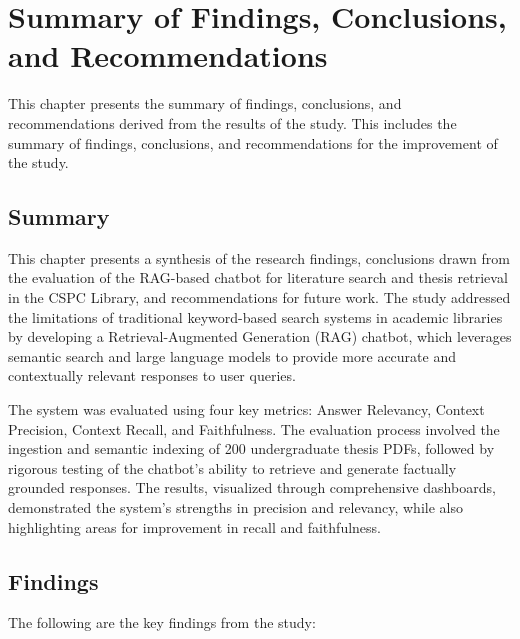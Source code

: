 \chapter{Summary of Findings, Conclusions, and Recommendations}
\begin{refsection}

This chapter presents the summary of findings, conclusions, and recommendations derived from the results of the study. This includes the summary of findings, conclusions, and recommendations for the improvement of the study.

\section*{Summary}

This chapter presents a synthesis of the research findings, conclusions drawn from the evaluation of the RAG-based chatbot for literature search and thesis retrieval in the CSPC Library, and recommendations for future work. The study addressed the limitations of traditional keyword-based search systems in academic libraries by developing a Retrieval-Augmented Generation (RAG) chatbot, which leverages semantic search and large language models to provide more accurate and contextually relevant responses to user queries.

The system was evaluated using four key metrics: Answer Relevancy, Context Precision, Context Recall, and Faithfulness. The evaluation process involved the ingestion and semantic indexing of 200 undergraduate thesis PDFs, followed by rigorous testing of the chatbot’s ability to retrieve and generate factually grounded responses. The results, visualized through comprehensive dashboards, demonstrated the system’s strengths in precision and relevancy, while also highlighting areas for improvement in recall and faithfulness.

\section*{Findings}

The following are the key findings from the study:


\end{refsection}
